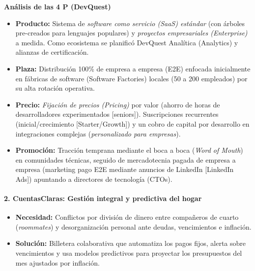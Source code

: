 \newpage

\textbf{Análisis de las 4 P (DevQuest)}
\begin{itemize}
    \item \textbf{Producto:} Sistema de \textit{software como servicio (SaaS) estándar} (con árboles pre-creados para lenguajes populares) y \textit{proyectos empresariales (Enterprise)} a medida. Como ecosistema se planificó DevQuest Analítica (Analytics) y alianzas de certificación.
    \item \textbf{Plaza:} Distribución 100\% de empresa a empresa (E2E) enfocada inicialmente en fábricas de software (Software Factories) locales (50 a 200 empleados) por su alta rotación operativa.
    \item \textbf{Precio:} \textit{Fijación de precios (Pricing)} por valor (ahorro de horas de desarrolladores experimentados [seniors]). Suscripciones recurrentes (inicial/crecimiento [Starter/Growth]) y un cobro de capital por desarrollo en integraciones complejas (\textit{personalizado para empresas}).
    \item \textbf{Promoción:} Tracción temprana mediante el boca a boca (\textit{Word of Mouth}) en comunidades técnicas, seguido de mercadotecnia pagada de empresa a empresa (marketing pago E2E mediante anuncios de LinkedIn [LinkedIn Ads]) apuntando a directores de tecnología (CTOs).
\end{itemize}

\paragraph{2. CuentasClaras: Gestión integral y predictiva del hogar}
\begin{itemize}
    \item \textbf{Necesidad:} Conflictos por división de dinero entre compañeros de cuarto (\textit{roommates}) y desorganización personal ante deudas, vencimientos e inflación.
    \item \textbf{Solución:} Billetera colaborativa que automatiza los pagos fijos, alerta sobre vencimientos y usa modelos predictivos para proyectar los presupuestos del mes ajustados por inflación.
\end{itemize}


